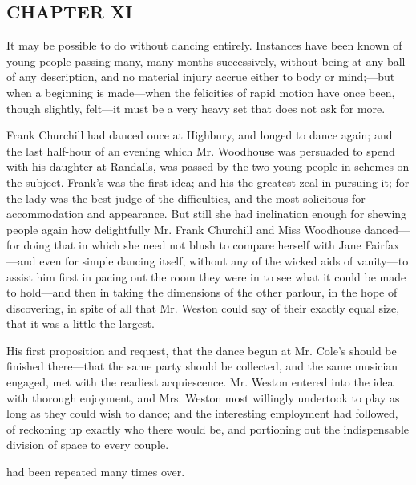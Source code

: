 \subsection[chapter-xi-1]{\useURL[url30][][][]\from[url30]CHAPTER XI}

It may be possible to do without dancing entirely. Instances have been known of young people passing many, many months successively, without being at any ball of any description, and no material injury accrue either to body or mind;---but when a beginning is made---when the felicities of rapid motion have once been, though slightly, felt---it must be a very heavy set that does not ask for more.

Frank Churchill had danced once at Highbury, and longed to dance again; and the last half-hour of an evening which Mr. Woodhouse was persuaded to spend with his daughter at Randalls, was passed by the two young people in schemes on the subject. Frank's was the first idea; and his the greatest zeal in pursuing it; for the lady was the best judge of the difficulties, and the most solicitous for accommodation and appearance. But still she had inclination enough for shewing people again how delightfully Mr. Frank Churchill and Miss Woodhouse danced---for doing that in which she need not blush to compare herself with Jane Fairfax---and even for simple dancing itself, without any of the wicked aids of vanity---to assist him first in pacing out the room they were in to see what it could be made to hold---and then in taking the dimensions of the other parlour, in the hope of discovering, in spite of all that Mr. Weston could say of their exactly equal size, that it was a little the largest.

His first proposition and request, that the dance begun at Mr. Cole's should be finished there---that the same party should be collected, and the same musician engaged, met with the readiest acquiescence. Mr. Weston entered into the idea with thorough enjoyment, and Mrs. Weston most willingly undertook to play as long as they could wish to dance; and the interesting employment had followed, of reckoning up exactly who there would be, and portioning out the indispensable division of space to every couple.

 had been repeated many times over. 

